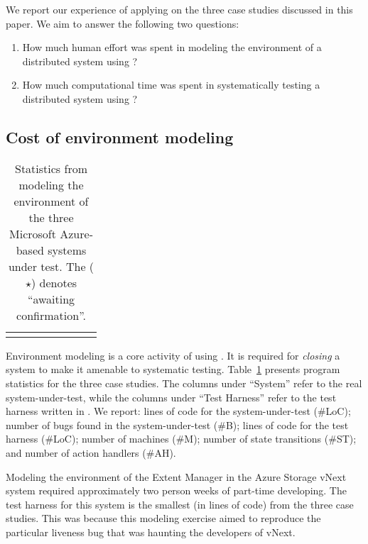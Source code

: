 We report our experience of applying \psharp on the three case studies discussed in this paper. We aim to answer the following two questions:

\begin{enumerate}
\item How much human effort was spent in modeling the environment of a distributed system using \psharp?

\item How much computational time was spent in systematically testing a distributed system using \psharp?
\end{enumerate}

\subsection{Cost of environment modeling}
\label{sec:eval:human_cost}

\newcommand{\colspacing}{\hspace{1.8em}}
\begin{table}[t]
\small
\centering
\setlength{\tabcolsep}{0.3em}
\begin{tabular}{l rrrrr rr}
\centering

\end{tabular}
\caption{Statistics from modeling the environment of the three Microsoft Azure-based systems under test. The ($\star$) denotes ``awaiting confirmation''.}
\label{tab:stats}
\end{table}

Environment modeling is a core activity of using \psharp. It is required for \emph{closing} a system to make it amenable to systematic testing. Table~\ref{tab:stats} presents program statistics for the three case studies. The columns under ``System'' refer to the real system-under-test, while the columns under ``\psharp Test Harness'' refer to the test harness written in \psharp. We report: lines of code for the system-under-test (\#LoC); number of bugs found in the system-under-test (\#B); lines of \psharp code for the test harness (\#LoC); number of machines (\#M); number of state transitions (\#ST); and number of action handlers (\#AH).

Modeling the environment of the Extent Manager in the Azure Storage vNext system required approximately two person weeks of part-time developing. The \psharp test harness for this system is the smallest (in lines of code) from the three case studies. This was because this modeling exercise aimed to reproduce the particular liveness bug that was haunting the developers of vNext.

